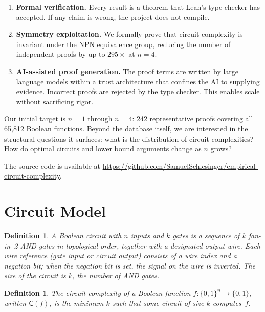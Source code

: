 \documentclass[11pt]{article}
\newtheorem{definition}[theorem]{Definition}
\newcommand{\Bool}{\{0,1\}}
\newcommand{\CC}{\mathsf{C}}
\begin{document}
\begin{enumerate}[leftmargin=*]
\item \textbf{Formal verification.} Every result is a theorem that Lean's type
  checker has accepted. If any claim is wrong, the project does not compile.

\item \textbf{Symmetry exploitation.} We formally prove that circuit
  complexity is invariant under the NPN equivalence group, reducing the number
  of independent proofs by up to $295\times$ at $n=4$.

\item \textbf{AI-assisted proof generation.} The proof terms are written by
  large language models within a trust architecture that confines the AI to
  supplying evidence. Incorrect proofs are rejected by the type checker. This
  enables scale without sacrificing rigor.
\end{enumerate}

Our initial target is $n = 1$ through $n = 4$: 242 representative proofs
covering all 65{,}812 Boolean functions. Beyond the database itself, we are
interested in the structural questions it surfaces: what is the distribution of
circuit complexities? How do optimal circuits and lower bound arguments change
as $n$ grows?

The source code is available at
\url{https://github.com/SamuelSchlesinger/empirical-circuit-complexity}.

\section{Circuit Model}

\begin{definition}
A \emph{Boolean circuit} with $n$ inputs and $k$ gates is a sequence of $k$
fan-in~2 AND gates in topological order, together with a designated output
wire. Each wire reference (gate input or circuit output) consists of a wire
index and a \emph{negation bit}; when the negation bit is set, the signal on
the wire is inverted. The \emph{size} of the circuit is $k$, the number of AND
gates.
\end{definition}

\begin{definition}
The \emph{circuit complexity} of a Boolean function $f : \Bool^n \to \Bool$,
written $\CC(f)$, is the minimum $k$ such that some circuit of size $k$
computes~$f$.
\end{definition}
\end{document}
